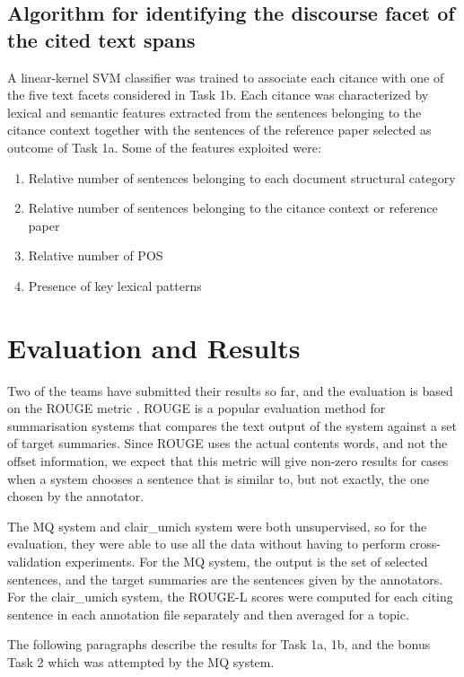 \documentclass[11pt]{article}
\begin{document}
\subsection{Algorithm for identifying the discourse facet of the 
											cited text spans}
A linear-kernel SVM classifier was trained to associate each citance with one
 of the five text facets considered in Task 1b. Each citance was characterized 
 by lexical and semantic features extracted from the sentences belonging to 
 the citance context together with the sentences of the reference paper 
 selected as outcome of Task 1a.
Some of the features exploited were:
\begin{enumerate}
\item{Relative number of sentences belonging to each document structural 
		category}
\item{Relative number of sentences belonging to the citance context or 
		reference paper}
\item{Relative number of POS}
\item{Presence of key lexical patterns}
\end{enumerate}

\section{Evaluation and Results}
Two of the teams have submitted their results so far, and the evaluation 
is based on the ROUGE metric \cite{Lin:2004}. ROUGE is a popular evaluation
 method for summarisation systems that compares the text output of the system 
 against a set of target summaries. Since ROUGE uses the actual contents words, 
 and not the offset information, we expect that this metric will give non-zero 
 results for cases when a system chooses a sentence that is similar to, but not 
 exactly, the one chosen by the annotator.

The MQ system and clair\_umich system were both unsupervised, so for the 
evaluation, they were able to use all the data without having to perform 
cross-validation experiments. For the MQ system, the output is the set of 
selected sentences, and the target summaries are the sentences given by the 
annotators.  For the clair\_umich system, the ROUGE-L scores were computed for 
each citing sentence in each annotation file separately and then averaged for 
a topic.


The following paragraphs describe the results for Task 1a, 1b, and the bonus 
Task 2 which was attempted by the MQ system. 
\end{document}
